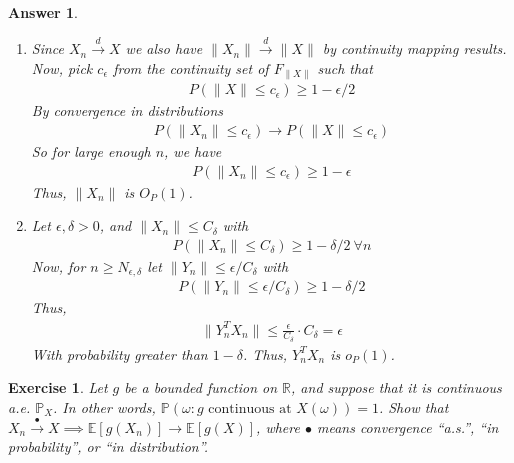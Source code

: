\documentclass[12pt]{article}
\theoremstyle{colon}
\newtheorem{exercise}{Exercise}
\newtheorem*{answer}{Answer}
\begin{document}
\begin{answer}
  \leavevmode
  \begin{enumerate}[label=\arabic*)]
    \item Since $X_n \xrightarrow{d} X$ we also have $\lVert X_n \rVert \xrightarrow{d} \lVert X \rVert$ by continuity mapping results.
      Now, pick $c_\epsilon$ from the continuity set of $F_{\lVert X \rVert}$ such that
      \begin{gather*}
        P(\lVert X \rVert \leq c_\epsilon) \geq 1 - \epsilon/2
      \end{gather*}
      By convergence in distributions
      \begin{gather*}
        P(\lVert X_n \rVert \leq c_\epsilon) \rightarrow P(\lVert X \rVert \leq c_\epsilon)
      \end{gather*}
      So for large enough $n$, we have
      \begin{gather*}
        P(\lVert X_n \rVert \leq c_\epsilon) \geq 1 - \epsilon
      \end{gather*}
      Thus, $\lVert X_n \rVert$ is $O_P(1)$.
    \item Let $\epsilon, \delta > 0$, and $\lVert X_n \rVert \leq C_\delta$ with
      \begin{gather*}
        P(\lVert X_n \rVert \leq C_\delta) \geq 1 - \delta/2 \ \forall n
      \end{gather*}
      Now, for $n \geq N_{\epsilon, \delta}$ let $\lVert Y_n \rVert \leq \epsilon/C_\delta$ with
      \begin{gather*}
        P(\lVert Y_n \rVert \leq \epsilon/C_\delta) \geq 1 - \delta/2
      \end{gather*}
      Thus,
      \begin{gather*}
        \lVert Y_n^T X_n \rVert \leq \frac{\epsilon}{C_\delta} \cdot C_\delta = \epsilon
      \end{gather*}
      With probability greater than $1 - \delta$. Thus, $Y_n^T X_n$ is $o_P(1)$.
  \end{enumerate}
\end{answer}

\clearpage

\begin{exercise}
  Let $g$ be a bounded function on $\mathbb{R}$, and suppose that it is continuous a.e. $\mathbb{P}_X$. In other words, $\mathbb{P}(\omega : g \text{ continuous at } X(\omega)) = 1$. Show that $X_n \xrightarrow{\bullet} X \implies \mathbb{E}[g(X_n)] \rightarrow \mathbb{E}[g(X)]$, where $\bullet$ means convergence ``a.s.'', ``in probability'', or ``in distribution''.
\end{exercise}
\end{document}
